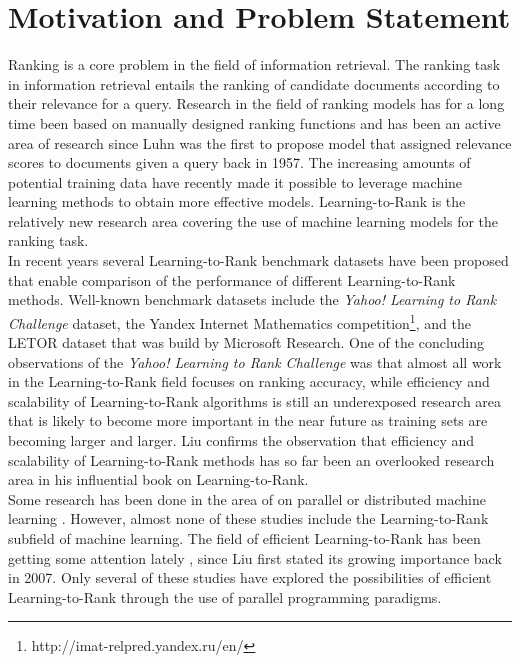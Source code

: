 \chapter{Motivation and Problem Statement}
Ranking is a core problem in the field of information retrieval. The ranking task in information retrieval entails the ranking of candidate documents according to their relevance for a query. Research in the field of ranking models has for a long time been based on manually designed ranking functions and has been an active area of research since Luhn\cite{Luhn1957} was the first to propose model that assigned relevance scores to documents given a query back in 1957. The increasing amounts of potential training data have recently made it possible to leverage machine learning methods to obtain more effective models. Learning-to-Rank is the relatively new research area covering the use of machine learning models for the ranking task.\\

In recent years several Learning-to-Rank benchmark datasets have been proposed that enable comparison of the performance of different Learning-to-Rank methods. Well-known benchmark datasets include the \emph{Yahoo! Learning to Rank Challenge} dataset\cite{Chapelle2011a}, the Yandex Internet Mathematics competition\footnote{http://imat-relpred.yandex.ru/en/}, and the LETOR dataset\cite{Qin2010} that was build by Microsoft Research. One of the concluding observations of the \emph{Yahoo! Learning to Rank Challenge} was that almost all work in the Learning-to-Rank field focuses on ranking accuracy, while efficiency and scalability of Learning-to-Rank algorithms is still an underexposed research area that is likely to become more important in the near future as training sets are becoming larger and larger\cite{Chapelle2011b}. Liu\cite{Liu2007} confirms the observation that efficiency and scalability of Learning-to-Rank methods has so far been an overlooked research area in his influential book on Learning-to-Rank.\\

Some research has been done in the area of on parallel or distributed machine learning \cite{Chu2007,Chang2007}. However, almost none of these studies include the Learning-to-Rank subfield of machine learning. The field of efficient Learning-to-Rank has been getting some attention lately \cite{Asadi2013a,Asadi2013b,Busa-Fekete2012,Sousa2012,Shukla2012}, since Liu \cite{Liu2007} first stated its growing importance back in 2007. Only several of these studies \cite{Sousa2012,Shukla2012} have explored the possibilities of efficient Learning-to-Rank through the use of parallel programming paradigms.\\

